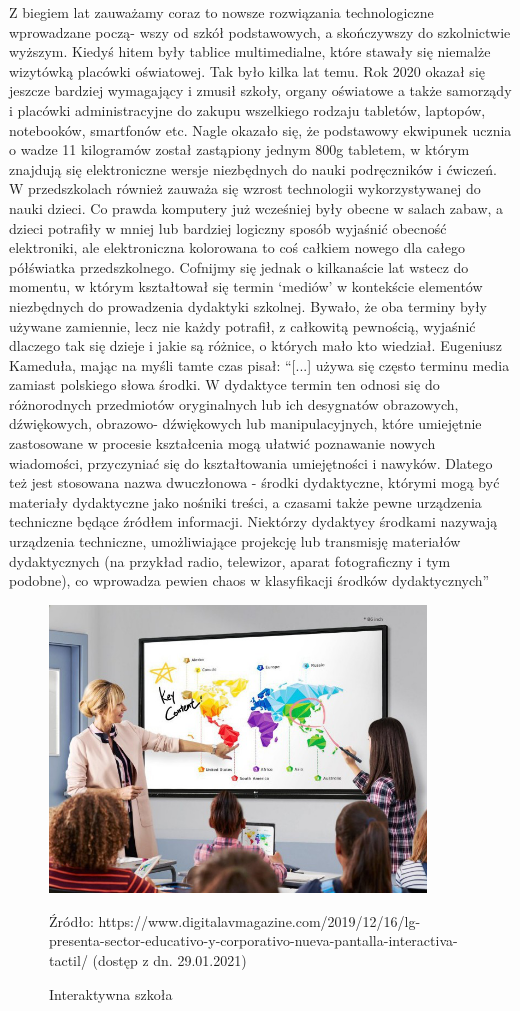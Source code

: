 \documentclass{article}
\begin{document}
	Z biegiem lat zauważamy coraz to nowsze rozwiązania technologiczne wprowadzane począ- wszy od szkół podstawowych, a skończywszy do szkolnictwie wyższym. Kiedyś hitem były tablice multimedialne, które stawały się niemalże wizytówką placówki oświatowej. Tak było kilka lat temu. Rok 2020 okazał się jeszcze bardziej wymagający i zmusił szkoły, organy oświatowe a także samorządy i placówki administracyjne do zakupu wszelkiego rodzaju tabletów, laptopów, notebooków, smartfonów etc. Nagle okazało się, że podstawowy ekwipunek ucznia o wadze 11 kilogramów został zastąpiony jednym 800g tabletem, w którym znajdują się elektroniczne wersje niezbędnych do nauki podręczników i ćwiczeń. W przedszkolach również zauważa się wzrost technologii wykorzystywanej do nauki dzieci. Co prawda komputery już wcześniej były obecne w salach zabaw, a dzieci potrafiły w mniej lub bardziej logiczny sposób wyjaśnić obecność elektroniki, ale elektroniczna kolorowana to coś całkiem nowego dla całego półświatka przedszkolnego. Cofnijmy się jednak o kilkanaście lat wstecz do momentu, w którym kształtował się termin ‘mediów’ w kontekście elementów niezbędnych do prowadzenia dydaktyki szkolnej. Bywało, że oba terminy były używane zamiennie, lecz nie każdy potrafił, z całkowitą pewnością, wyjaśnić dlaczego tak się dzieje i jakie są różnice, o których mało kto wiedział. Eugeniusz Kameduła\cite{ref7}, mając na myśli tamte czas pisał: “[...] używa się często terminu media zamiast polskiego słowa środki. W dydaktyce termin ten odnosi się do różnorodnych przedmiotów oryginalnych lub ich desygnatów obrazowych, dźwiękowych, obrazowo- dźwiękowych lub manipulacyjnych, które umiejętnie zastosowane w procesie kształcenia mogą ułatwić poznawanie nowych wiadomości, przyczyniać się do kształtowania umiejętności i nawyków. Dlatego też jest stosowana nazwa dwuczłonowa - środki dydaktyczne, którymi mogą być materiały dydaktyczne jako nośniki treści, a czasami także pewne urządzenia techniczne będące źródłem informacji. Niektórzy dydaktycy środkami nazywają urządzenia techniczne, umożliwiające projekcję lub transmisję materiałów dydaktycznych (na przykład radio, telewizor, aparat fotograficzny i tym podobne), co wprowadza pewien chaos w klasyfikacji środków dydaktycznych”
	\begin{figure}
		\centering
		\includegraphics[width=10cm]{modern_school}
		\caption{Interaktywna szkoła}
		Źródło: https://www.digitalavmagazine.com/2019/12/16/lg-presenta-sector-educativo-y-corporativo-nueva-pantalla-interactiva-tactil/ (dostęp z dn. 29.01.2021)
	\end{figure}
\end{document}
